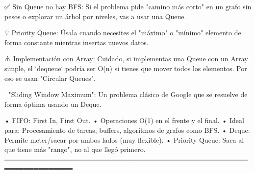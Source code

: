 \begin{dsaentrevistas}

✅ Sin Queue no hay BFS: Si el problema pide "camino más corto" en un
   grafo sin pesos o explorar un árbol por niveles, vas a usar una Queue.

💡 Priority Queue: Úsala cuando necesites el "máximo" o "mínimo" 
   elemento de forma constante mientras insertas nuevos datos.

⚠️ Implementación con Array: Cuidado, si implementas una Queue con un
   Array simple, el `dequeue` podría ser O(n) si tienes que mover todos 
   los elementos. Por eso se usan "Circular Queues".

🔑 "Sliding Window Maximum": Un problema clásico de Google que se 
   resuelve de forma óptima usando un Deque.

\end{dsaentrevistas}

\begin{dsaresumen}

• FIFO: First In, First Out.
• Operaciones O(1) en el frente y el final.
• Ideal para: Procesamiento de tareas, buffers, algoritmos de grafos
  como BFS.
• Deque: Permite meter/sacar por ambos lados (muy flexible).
• Priority Queue: Saca al que tiene más "rango", no al que llegó primero.
════════════════════════════════════════════════════════════════

\end{dsaresumen}


